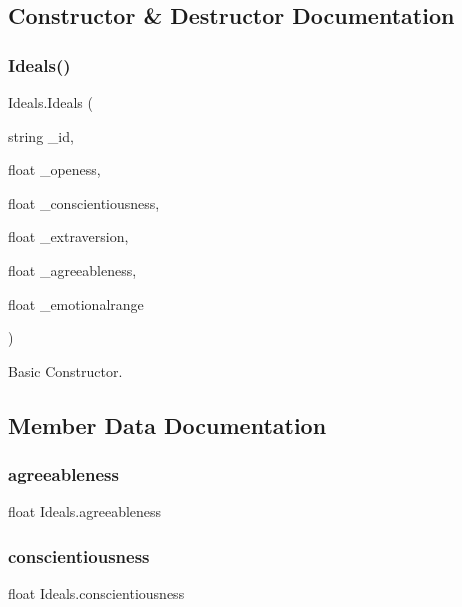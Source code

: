 \subsection{Constructor \& Destructor Documentation}
\mbox{\label{class_ideals_abd4643b2fa3716e9481f924e5bf5fff3}} 
\subsubsection{\texorpdfstring{Ideals()}{Ideals()}}
{\footnotesize\ttfamily Ideals.\+Ideals (\begin{DoxyParamCaption}\item[{string}]{\+\_\+id,  }\item[{float}]{\+\_\+openess,  }\item[{float}]{\+\_\+conscientiousness,  }\item[{float}]{\+\_\+extraversion,  }\item[{float}]{\+\_\+agreeableness,  }\item[{float}]{\+\_\+emotionalrange }\end{DoxyParamCaption})\hspace{0.3cm}{\ttfamily [inline]}}



Basic Constructor. 



\subsection{Member Data Documentation}
\mbox{\label{class_ideals_a392c9c4d471c383b7ed47eab5eff54ce}} 
\subsubsection{\texorpdfstring{agreeableness}{agreeableness}}
{\footnotesize\ttfamily float Ideals.\+agreeableness}

\mbox{\label{class_ideals_ab111253ba1026e09b2a87b2b0accaee8}} 
\subsubsection{\texorpdfstring{conscientiousness}{conscientiousness}}
{\footnotesize\ttfamily float Ideals.\+conscientiousness}

